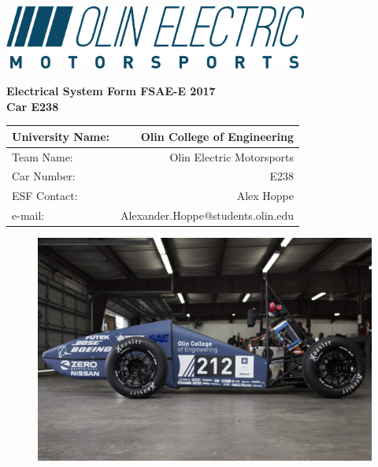 \documentclass{article}
\begin{document}
\renewcommand{\headrulewidth}{0pt}
\chead{}
\rhead{\rightmark}
\rfoot{\thepage}

\begin{titlepage}

    \centering
    \vfill
    \includegraphics[width=10cm]{logo_blue.png}

    {\bfseries\Large
        \vskip3cm
        Electrical System Form FSAE-E 2017\\
        Car E238\\
    }

    \begin{table}[H]
        \centering
        \label{my-label}
        \begin{tabular}{lr}
        University Name: & Olin College of Engineering \\ \hline
        Team Name: & Olin Electric Motorsports \\ \hline
        Car Number: & E238 \\ \hline
        ESF Contact: & Alex Hoppe \\ \hline
        e-mail: & Alexander.Hoppe@students.olin.edu \\ \hline
        \end{tabular}
    \end{table}
\vfill

\begin{figure}[H]
\centering
\includegraphics[width = 0.9 \textwidth]{mk1}
\end{figure}

\end{titlepage}
\end{document}
